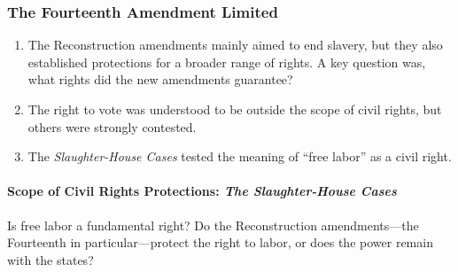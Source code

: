 \subsubsection{The Fourteenth Amendment Limited}

\begin{enumerate}
    \item The Reconstruction amendments mainly aimed to end slavery, but they 
    also established protections for a broader range of rights. A key question 
    was, what rights did the new amendments guarantee?
    \item The right to vote was understood to be outside the scope of civil 
    rights, but others were strongly contested.
    \item The \emph{Slaughter-House Cases} tested the meaning of ``free labor'' 
    as a civil right.
\end{enumerate}

\paragraph{Scope of Civil Rights Protections: \emph{The Slaughter-House Cases}}

Is free labor a fundamental right? Do the Reconstruction amendments---the 
Fourteenth in particular---protect the right to labor, or does the power 
remain with the states?

